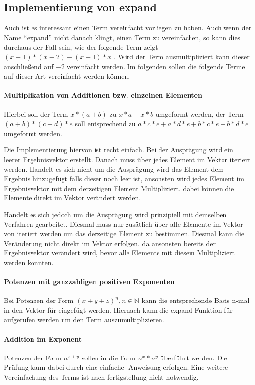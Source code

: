 \documentclass[11pt,a4paper, ngerman]{article}
\begin{document}
\subsection{Implementierung von expand}
Auch ist es interessant einen Term vereinfacht vorliegen zu haben. Auch wenn der Name ``expand'' nicht danach klingt, einen Term zu vereinfachen, so kann dies durchaus der Fall sein, wie der folgende Term zeigt $(x + 1)*(x - 2) - (x - 1)*x$ \cite{SymPyExpand}. Wird der Term ausmultipliziert kann dieser anschließend auf $-2$ vereinfacht werden. Im folgenden sollen die folgende Terme auf dieser Art vereinfacht werden können.

\paragraph{Multiplikation von Additionen bzw. einzelnen Elementen} Hierbei soll der Term $x*(a+b)$ zu $x*a+x*b$ umgeformt werden, der Term $(a+b)*(c+d)*e$ soll entsprechend zu $a*c*e + a*d*e + b*c*e + b*d*e$ umgeformt werden.

Die Implementierung hiervon ist recht einfach. Bei der Ausprägung  wird ein leerer Ergebnisvektor erstellt. Danach muss über jedes Element im Vektor iteriert werden. Handelt es sich nicht um die Ausprägung  wird das Element dem Ergebnis hinzugefügt falls dieser noch leer ist, ansonsten wird jedes Element im Ergebnisvektor mit dem derzeitigen Element Multipliziert, dabei können die Elemente direkt im Vektor verändert werden.

Handelt es sich jedoch um die Ausprägung  wird prinzipiell mit demselben Verfahren gearbeitet. Diesmal muss nur zusätlich über alle Elemente im Vektor von  iteriert werden um das derzeitige Element zu bestimmen. Diesmal kann die Veränderung nicht direkt im Vektor erfolgen, da ansonsten bereits der Ergebnisvektor verändert wird, bevor alle Elemente mit diesem Multipliziert werden konnten.

\paragraph{Potenzen mit ganzzahligen positiven Exponenten} Bei Potenzen der Form $(x+y+z)^n, n \in \mathbb{N}$ kann die entsprechende Basis n-mal in den Vektor für  eingefügt werden. Hiernach kann die expand-Funktion für  aufgerufen werden um den Term auszumultiplizieren. 

\paragraph{Addition im Exponent} Potenzen der Form $n^{x+y}$ sollen in die Form $n^x*n^y$ überführt werden. Die Prüfung kann dabei durch eine einfache -Anweisung erfolgen. Eine weitere Vereinfachung des Terms ist nach fertigstellung nicht notwendig.
\end{document}
